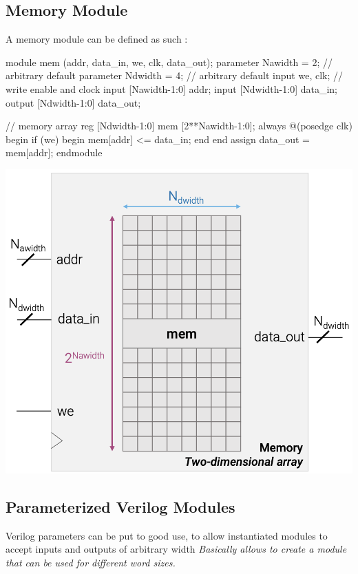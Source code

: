 \documentclass[12pt,openany]{book}
\begin{document}
\subsection{Memory Module}
A memory module can be defined as such :\newline
\vspace*{5px}
\begin{minipage}{0.45\textwidth}
	\begin{vhdl}
module mem (addr, data_in, we, clk, data_out);
	parameter Nawidth = 2; // arbitrary default
	parameter Ndwidth = 4; // arbitrary default
	input we, clk; // write enable and clock
	input [Nawidth-1:0] addr;
	input [Ndwidth-1:0] data_in;
	output [Ndwidth-1:0] data_out;

	// memory array
	reg [Ndwidth-1:0] mem [2**Nawidth-1:0];
	always @(posedge clk) begin
	if (we) begin
		mem[addr] <= data_in;
	end
	end
	assign data_out = mem[addr];
endmodule
\end{vhdl}
\end{minipage}
\hfill
\vline
\hfill
\begin{minipage}[htp]{0.45\textwidth}
	\centering
	\includegraphics[width=1\textwidth]{circuits/16.2.4.png}
\end{minipage}

\subsection{Parameterized Verilog Modules}
Verilog parameters can be put to good use, to allow instantiated modules to accept inputs and outputs of arbitrary width
\newline
\textit{Basically allows to create a module that can be used for different word sizes.}\newline
\end{document}
